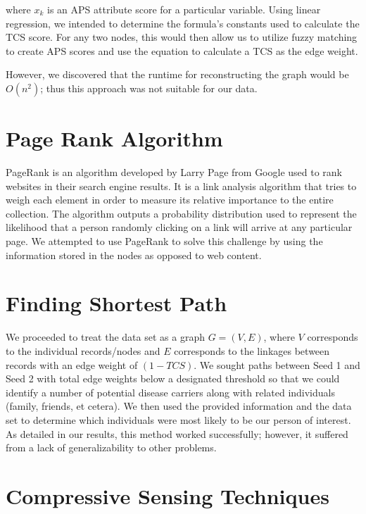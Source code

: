 \documentclass{article} %
\begin{document}
where $x_k$ is an APS attribute score for a particular variable. Using linear regression, we intended to determine the formula's constants used to calculate the TCS score. For any two nodes, this would then allow us to utilize fuzzy matching to create APS scores and use the equation to calculate a TCS as the edge weight.

However, we discovered that the runtime for reconstructing the graph would be $O(n^2)$; thus this approach was not suitable for our data.


\section{Page Rank Algorithm}

PageRank is an algorithm developed by Larry Page from Google used to rank websites in their search engine results. It is a link analysis algorithm that tries to weigh each element in order to measure its relative importance to the entire collection. The algorithm outputs a probability distribution used to represent the likelihood that a person randomly clicking on a link will arrive at any particular page. We attempted to use PageRank to solve this challenge by using the information stored in the nodes as opposed to web content.



\section{Finding Shortest Path}
We proceeded to treat the data set as a graph $G = (V,E)$, where $V$ corresponds to the individual records/nodes and $E$ corresponds to the linkages between records with an edge weight of $(1-TCS)$. We sought paths between Seed 1 and Seed 2 with total edge weights below a designated threshold so that we could identify a number of potential disease carriers along with related individuals (family, friends, et cetera). We then used the provided information and the data set to determine which individuals were most likely to be our person of interest. As detailed in our results, this method worked successfully; however, it suffered from a lack of generalizability to other problems. 




\section{Compressive Sensing Techniques}
\end{document}
